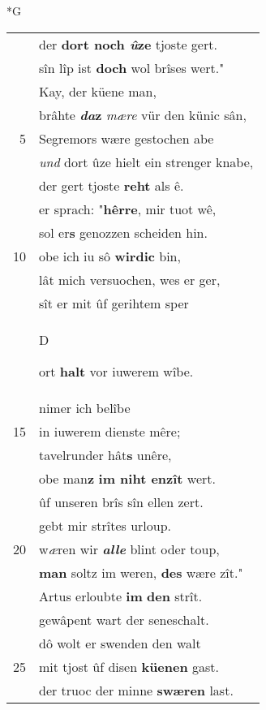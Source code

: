 \documentclass[8pt,a4paper,notitlepage]{article}
\begin{document}
\newpage
\begin{table}[ht]
\begin{minipage}[t]{0.5\linewidth}
\small
\begin{center}*G
\end{center}
\begin{tabular}{rl}
 & der \textbf{dort noch \textit{û}ze} tjoste gert.\\ 
 & sîn lîp ist \textbf{doch} wol brîses wert."\\ 
 & Kay, der küene man,\\ 
 & brâhte \textbf{\textit{da}z} \textit{mære} vür den künic sân,\\ 
5 & Segremors wære gestochen abe\\ 
 & \textit{und} dort ûze hielt ein strenger knabe,\\ 
 & der gert tjoste \textbf{reht} als ê.\\ 
 & er sprach: "\textbf{hêrre}, mir tuot wê,\\ 
 & sol er\textbf{s} genozzen scheiden hin.\\ 
10 & obe ich iu sô \textbf{wirdic} bin,\\ 
 & lât mich versuochen, wes er ger,\\ 
 & sît er mit ûf gerihtem sper\\ 
 & \begin{large}D\end{large}ort \textbf{halt} vor iuwerem wîbe.\\ 
 & nimer ich belîbe\\ 
15 & in iuwerem dienste mêre;\\ 
 & tavelrunder hât\textbf{s} unêre,\\ 
 & obe man\textbf{z} \textbf{im niht enzît} wert.\\ 
 & ûf unseren brîs sîn ellen zert.\\ 
 & gebt mir strîtes urloup.\\ 
20 & w\textit{æ}ren wir \textit{\textbf{alle}} blint oder toup,\\ 
 & \textbf{man} soltz im weren, \textbf{des} wære zît."\\ 
 & Artus erloubte \textbf{im} \textbf{den} strît.\\ 
 & gewâpent wart der seneschalt.\\ 
 & dô wolt er swenden den walt\\ 
25 & mit tjost ûf disen \textbf{küenen} gast.\\ 
 & der truoc der minne \textbf{swæren} last.\\ 

\end{tabular}
\end{minipage}
\end{table}
\end{document}
